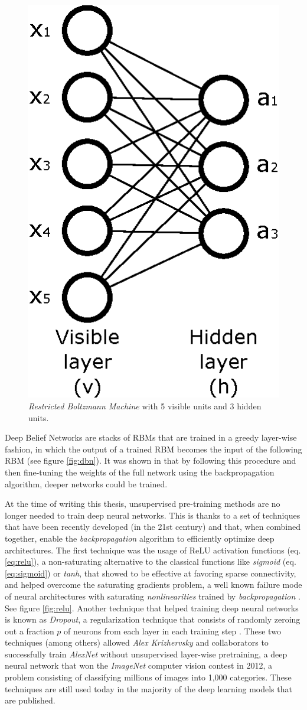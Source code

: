 \begin{figure}
	\centering
	\includegraphics[width=0.2\linewidth]{chapter2/images/rbm}
	\caption{\textit{Restricted Boltzmann Machine} with 5 visible units and 3 hidden units.}
	\label{fig:rbm}
\end{figure}

Deep Belief Networks are stacks of RBMs that are trained in a greedy layer-wise fashion, in which the output of a trained RBM becomes the input of the following RBM \cite{hinton2006} (see figure \ref{fig:dbn}). It was shown in \cite{Bengio2007} that by following this procedure and then fine-tuning the weights of the full network using the backpropagation algorithm, deeper networks could be trained. 




At the time of writing this thesis, unsupervised pre-training methods are no longer needed to train deep neural networks. This is thanks to a set of techniques that have been recently developed (in the 21st century) and that, when combined together, enable the \textit{backpropagation} algorithm to efficiently optimize deep architectures. The first technique was the usage of ReLU activation functions \cite{nair2010} (eq. \ref{eq:relu}), a non-saturating alternative to the classical functions like \textit{sigmoid} (eq. \ref{eq:sigmoid}) or \textit{tanh}, that showed to be effective at favoring sparse connectivity, and helped overcome the saturating gradients problem, a well known failure mode of neural architectures with saturating \textit{nonlinearities} trained by \textit{backpropagation} \cite{Hong2019}. See figure \ref{fig:relu}. Another technique that helped training deep neural networks is known as \textit{Dropout}, a regularization technique that consists of randomly zeroing out a fraction $p$ of neurons from each layer in each training step \cite{hinton2012, srivastava2014}. These two techniques (among others) allowed \textit{Alex Krizhervsky} and collaborators to successfully train \textit{AlexNet} without unsupervised layer-wise pretraining, a deep neural network that won the \textit{ImageNet} \cite{deng2009imagenet} computer vision contest in 2012, a problem consisting of classifying millions of images into 1,000 categories. These techniques are still used today in the majority of the deep learning models that are published. 

